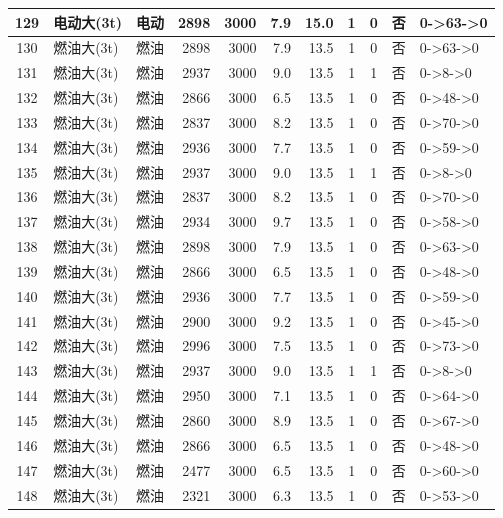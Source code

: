 \begin{landscape}
\begin{longtable}{|c|l|c|r|r|r|r|c|c|c|p{2.8cm}|}
\hline
\rowcolor{gray!8}
129 & 电动大(3t) & 电动 & 2898 & 3000 & 7.9 & 15.0 & 1 & 0 & 否 & 0->63->0 \\
\hline
130 & 燃油大(3t) & 燃油 & 2898 & 3000 & 7.9 & 13.5 & 1 & 0 & 否 & 0->63->0 \\
\hline
\rowcolor{gray!8}
131 & 燃油大(3t) & 燃油 & 2937 & 3000 & 9.0 & 13.5 & 1 & 1 & 否 & 0->8->0 \\
\hline
132 & 燃油大(3t) & 燃油 & 2866 & 3000 & 6.5 & 13.5 & 1 & 0 & 否 & 0->48->0 \\
\hline
\rowcolor{gray!8}
133 & 燃油大(3t) & 燃油 & 2837 & 3000 & 8.2 & 13.5 & 1 & 0 & 否 & 0->70->0 \\
\hline
134 & 燃油大(3t) & 燃油 & 2936 & 3000 & 7.7 & 13.5 & 1 & 0 & 否 & 0->59->0 \\
\hline
\rowcolor{gray!8}
135 & 燃油大(3t) & 燃油 & 2937 & 3000 & 9.0 & 13.5 & 1 & 1 & 否 & 0->8->0 \\
\hline
136 & 燃油大(3t) & 燃油 & 2837 & 3000 & 8.2 & 13.5 & 1 & 0 & 否 & 0->70->0 \\
\hline
\rowcolor{gray!8}
137 & 燃油大(3t) & 燃油 & 2934 & 3000 & 9.7 & 13.5 & 1 & 0 & 否 & 0->58->0 \\
\hline
138 & 燃油大(3t) & 燃油 & 2898 & 3000 & 7.9 & 13.5 & 1 & 0 & 否 & 0->63->0 \\
\hline
\rowcolor{gray!8}
139 & 燃油大(3t) & 燃油 & 2866 & 3000 & 6.5 & 13.5 & 1 & 0 & 否 & 0->48->0 \\
\hline
140 & 燃油大(3t) & 燃油 & 2936 & 3000 & 7.7 & 13.5 & 1 & 0 & 否 & 0->59->0 \\
\hline
\rowcolor{gray!8}
141 & 燃油大(3t) & 燃油 & 2900 & 3000 & 9.2 & 13.5 & 1 & 0 & 否 & 0->45->0 \\
\hline
142 & 燃油大(3t) & 燃油 & 2996 & 3000 & 7.5 & 13.5 & 1 & 0 & 否 & 0->73->0 \\
\hline
\rowcolor{gray!8}
143 & 燃油大(3t) & 燃油 & 2937 & 3000 & 9.0 & 13.5 & 1 & 1 & 否 & 0->8->0 \\
\hline
144 & 燃油大(3t) & 燃油 & 2950 & 3000 & 7.1 & 13.5 & 1 & 0 & 否 & 0->64->0 \\
\hline
\rowcolor{gray!8}
145 & 燃油大(3t) & 燃油 & 2860 & 3000 & 8.9 & 13.5 & 1 & 0 & 否 & 0->67->0 \\
\hline
146 & 燃油大(3t) & 燃油 & 2866 & 3000 & 6.5 & 13.5 & 1 & 0 & 否 & 0->48->0 \\
\hline
\rowcolor{gray!8}
147 & 燃油大(3t) & 燃油 & 2477 & 3000 & 6.5 & 13.5 & 1 & 0 & 否 & 0->60->0 \\
\hline
148 & 燃油大(3t) & 燃油 & 2321 & 3000 & 6.3 & 13.5 & 1 & 0 & 否 & 0->53->0 \\

\end{longtable}
\end{landscape}
